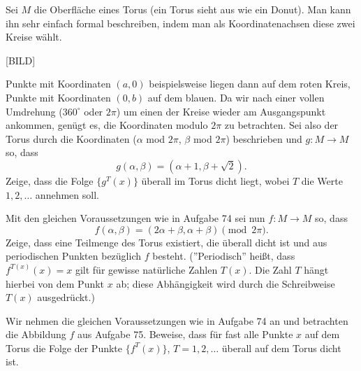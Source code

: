 \documentclass[12pt]{article} %
\begin{document}


\bigskip
{} 
Sei $M$ die Oberfläche eines Torus (ein Torus sieht aus wie ein Donut). Man kann ihn sehr einfach formal beschreiben, indem man als Koordinatenachsen diese zwei Kreise wählt. 

[BILD]

Punkte mit Koordinaten $(a,0)$ beispielsweise liegen dann auf dem roten Kreis, Punkte mit Koordinaten $(0,b)$ auf dem blauen. 
Da wir nach einer vollen Umdrehung ($360^\circ$ oder $2\pi$) um einen der Kreise wieder am Ausgangspunkt ankommen, genügt es, die Koordinaten modulo $2\pi$ zu betrachten. \newline
Sei also der Torus durch die Koordinaten ($\alpha$ mod $2\pi$, $\beta$ mod $2\pi$) beschrieben und $g: M\to M$ so, dass
\[g(\alpha, \beta)=(\alpha+1, \beta+ \sqrt{2}).\]
Zeige, dass die Folge $\{g^T (x)\}$ überall im Torus dicht liegt, wobei $T$ die Werte $1,2,\dots$ annehmen soll. 


\bigskip
{} Mit den gleichen Voraussetzungen wie in Aufgabe 74 sei nun $f: M\to M$ so, dass
\[
f(\alpha, \beta)=(2\alpha+\beta,\alpha+\beta) \pmod {2\pi}.
\] 
Zeige, dass eine Teilmenge des Torus existiert, die überall dicht ist und aus periodischen Punkten bezüglich $f$ besteht. 
(''Periodisch'' heißt, dass $f^{T (x)} (x)=x$ gilt für gewisse natürliche Zahlen $T(x)$. Die Zahl $T$ hängt hierbei von dem Punkt $x$ ab; diese Abhängigkeit wird durch die Schreibweise $T(x)$ ausgedrückt.)

\bigskip
{} Wir nehmen die gleichen Voraussetzungen wie in Aufgabe 74 an und betrachten die Abbildung $f$ aus Aufgabe 75. Beweise, dass für fast alle Punkte $x$ auf dem Torus die Folge der Punkte $\{f^T (x)\}$, $T=1, 2, \dots$ überall auf dem Torus dicht ist. 
\end{document}
